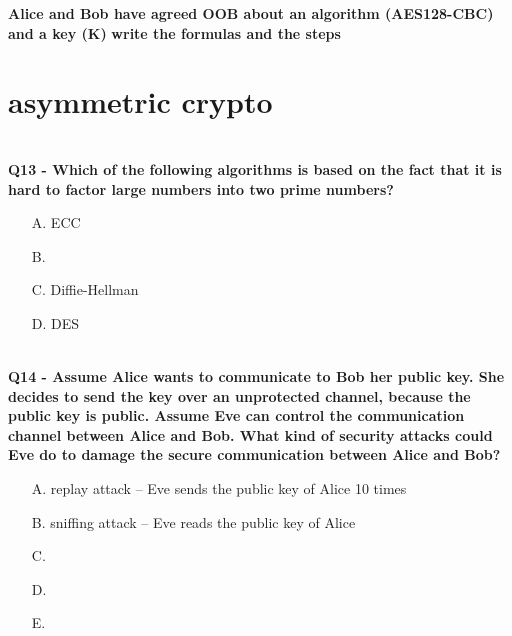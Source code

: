 \textbf{Alice and Bob have agreed OOB about an algorithm (AES128-CBC) and a key (K)}
\textbf{write the formulas and the steps}

\section{asymmetric crypto}

\textbf{\\Q13 - Which of the following algorithms is based on the fact that it is hard to factor large numbers into two prime numbers?}
\begin{enumerate}
    \item[A.] ECC
    \item[B.] 
    \item[C.] Diffie-Hellman
    \item[D.] DES
\end{enumerate}

\textbf{\\Q14 - Assume Alice wants to communicate to Bob her public key. She decides to send the key over an unprotected channel, because the public key is public. Assume Eve can control the communication channel between Alice and Bob. What kind of security attacks could Eve do to damage the secure communication between Alice and Bob?}
\begin{enumerate}
    \item[A.] replay attack – Eve sends the public key of Alice 10 times
    \item[B.] sniffing attack – Eve reads the public key of Alice
    \item[C.] 
    \item[D.] 
    \item[E.] 
\end{enumerate}

